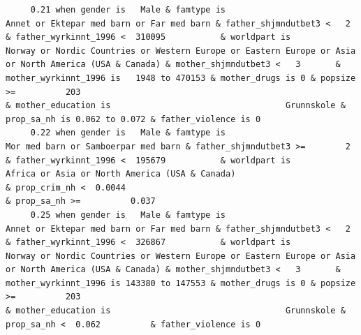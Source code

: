 \documentclass[
  letterpaper,
  DIV=11,
  numbers=noendperiod]{scrreprt}
\begin{document}
\begin{verbatim}
     0.21 when gender is   Male & famtype is                        Annet or Ektepar med barn or Far med barn & father_shjmndutbet3 <   2       & father_wyrkinnt_1996 <  310095           & worldpart is                              Norway or Nordic Countries or Western Europe or Eastern Europe or Asia or North America (USA & Canada) & mother_shjmndutbet3 <   3       & mother_wyrkinnt_1996 is   1948 to 470153 & mother_drugs is 0 & popsize >=          203                                                                                                                                                                        & mother_education is                                   Grunnskole & prop_sa_nh is 0.062 to 0.072 & father_violence is 0                                                                                                               
     0.22 when gender is   Male & famtype is                              Mor med barn or Samboerpar med barn & father_shjmndutbet3 >=        2 & father_wyrkinnt_1996 <  195679           & worldpart is                                                                                      Africa or Asia or North America (USA & Canada)                                                                                                                                                                                                                            & prop_crim_nh <  0.0044                                                                                                                  & prop_sa_nh >=          0.037                                                                                                                                      
     0.25 when gender is   Male & famtype is                        Annet or Ektepar med barn or Far med barn & father_shjmndutbet3 <   2       & father_wyrkinnt_1996 <  326867           & worldpart is                              Norway or Nordic Countries or Western Europe or Eastern Europe or Asia or North America (USA & Canada) & mother_shjmndutbet3 <   3       & mother_wyrkinnt_1996 is 143380 to 147553 & mother_drugs is 0 & popsize >=          203                                                                                                                                                                        & mother_education is                                   Grunnskole & prop_sa_nh <  0.062          & father_violence is 0                                                                                                               

\end{verbatim}
\end{document}

